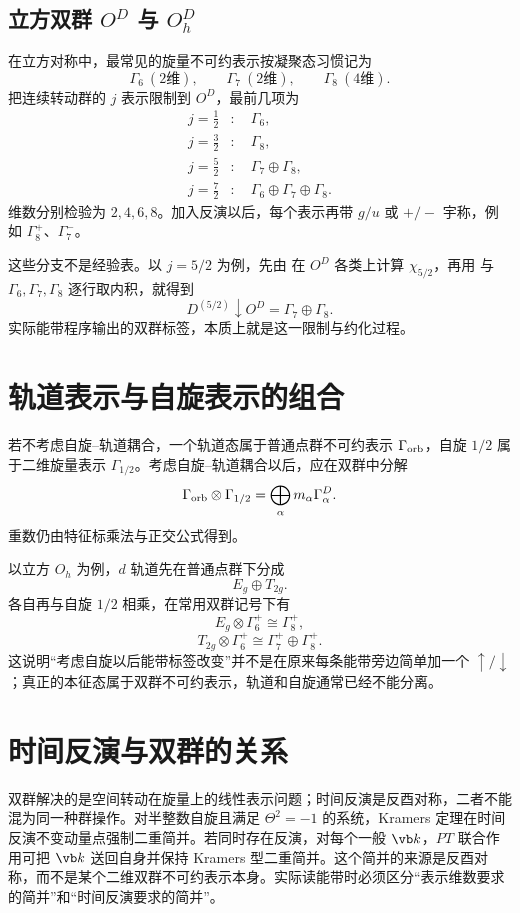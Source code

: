 \subsection{\texorpdfstring{立方双群 $O^D$ 与 $O_h^D$}{立方双群 OD 与 OhD}}

在立方对称中，最常见的旋量不可约表示按凝聚态习惯记为
\[
\Gamma_6\ (2\text{维}),
\qquad
\Gamma_7\ (2\text{维}),
\qquad
\Gamma_8\ (4\text{维}).
\]
把连续转动群的 $j$ 表示限制到 $O^D$，最前几项为
\begin{align*}
j=\frac12&:\quad \Gamma_6,\\
j=\frac32&:\quad \Gamma_8,\\
j=\frac52&:\quad \Gamma_7\oplus\Gamma_8,\\
j=\frac72&:\quad \Gamma_6\oplus\Gamma_7\oplus\Gamma_8.
\end{align*}
维数分别检验为 $2,4,6,8$。加入反演以后，每个表示再带 $g/u$ 或 $+/-$ 宇称，例如 $\Gamma_8^+$、$\Gamma_7^-$。

这些分支不是经验表。以 $j=5/2$ 为例，先由  在 $O^D$ 各类上计算 $\chi_{5/2}$，再用  与 $\Gamma_6,\Gamma_7,\Gamma_8$ 逐行取内积，就得到
\[
D^{(5/2)}\downarrow O^D=\Gamma_7\oplus\Gamma_8.
\]
实际能带程序输出的双群标签，本质上就是这一限制与约化过程。

\section{轨道表示与自旋表示的组合}

若不考虑自旋--轨道耦合，一个轨道态属于普通点群不可约表示 $\Gamma_{\rm orb}$，自旋 $1/2$ 属于二维旋量表示 $\Gamma_{1/2}$。考虑自旋--轨道耦合以后，应在双群中分解
\begin{equation}
\Gamma_{\rm orb}\otimes\Gamma_{1/2}
=\bigoplus_\alpha m_\alpha\Gamma_\alpha^D.
\label{eq:orbital-spin-double-product}
\end{equation}
重数仍由特征标乘法与正交公式得到。

以立方 $O_h$ 为例，$d$ 轨道先在普通点群下分成
\[
E_g\oplus T_{2g}.
\]
各自再与自旋 $1/2$ 相乘，在常用双群记号下有
\[
E_g\otimes\Gamma_6^+\cong\Gamma_8^+,
\]
\[
T_{2g}\otimes\Gamma_6^+\cong\Gamma_7^+\oplus\Gamma_8^+.
\]
这说明“考虑自旋以后能带标签改变”并不是在原来每条能带旁边简单加一个 $\uparrow/\downarrow$；真正的本征态属于双群不可约表示，轨道和自旋通常已经不能分离。

\section{时间反演与双群的关系}

双群解决的是空间转动在旋量上的线性表示问题；时间反演是反酉对称，二者不能混为同一种群操作。对半整数自旋且满足 $\Theta^2=-1$ 的系统，Kramers 定理在时间反演不变动量点强制二重简并。若同时存在反演，对每个一般 $\vb k$，$PT$ 联合作用可把 $\vb k$ 送回自身并保持 Kramers 型二重简并。这个简并的来源是反酉对称，而不是某个二维双群不可约表示本身。实际读能带时必须区分“表示维数要求的简并”和“时间反演要求的简并”。
